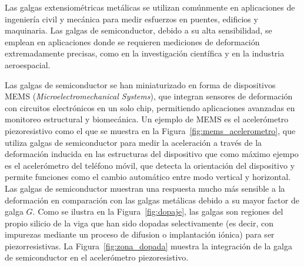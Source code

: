 Las galgas extensiométricas metálicas se utilizan comúnmente en aplicaciones de ingeniería civil y mecánica para medir esfuerzos en puentes, edificios y maquinaria. Las galgas de semiconductor, debido a su alta sensibilidad, se emplean en aplicaciones donde se requieren mediciones de deformación extremadamente precisas, como en la investigación científica y en la industria aeroespacial.

Las galgas de semiconductor se han miniaturizado en forma de dispositivos MEMS (\textit{Microelectromechanical Systems}), que integran sensores de deformación con circuitos electrónicos en un solo chip, permitiendo aplicaciones avanzadas en monitoreo estructural y biomecánica. Un ejemplo de MEMS es el acelerómetro piezoresistivo como el que se muestra en la Figura~\ref{fig:mems_acelerometro}, que utiliza galgas de semiconductor para medir la aceleración a través de la deformación inducida en las estructuras del dispositivo que como máximo ejempo es el acelerómetro del teléfono móvil, que detecta la orientación del dispositivo y permite funciones como el cambio automático entre modo vertical y horizontal. Las galgas de semiconductor muestran una respuesta mucho más sensible a la deformación en comparación con las galgas metálicas debido a su mayor factor de galga $G$. Como se ilustra en la Figura~\ref{fig:dopaje}, las galgas son regiones del propio silicio de la viga que han sido dopadas selectivamente (es decir, con impurezas mediante un proceso de difusion o implantación iónica) para ser piezorresistivas. La Figura~\ref{fig:zona_dopada} muestra la integración de la galga de semiconductor en el acelerómetro piezoresistivo. %
% 
